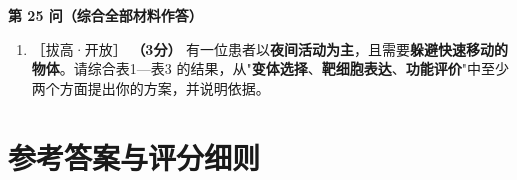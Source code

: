 \documentclass[UTF8,a4paper,11pt]{ctexart}
\newcommand{\pt}[1]{\textbf{（#1分）}}
\newcommand{\lv}[1]{{\small\color{deepgreen}［#1］}}
\begin{document}
\begin{qbox}
\noindent\textbf{\color{deepgreen}第 25 问（综合全部材料作答）}
\begin{enumerate}[leftmargin=2.2em,itemsep=5pt,start=25]
\item \lv{拔高·开放} \pt{3} 有一位患者以\textbf{夜间活动为主}，且需要\textbf{躲避快速移动的物体}。请综合表1—表3 的结果，从"\textbf{变体选择}、\textbf{靶细胞表达}、\textbf{功能评价}"中至少两个方面提出你的方案，并说明依据。
\end{enumerate}
\end{qbox}

\clearpage
\section*{参考答案与评分细则}
\end{document}
